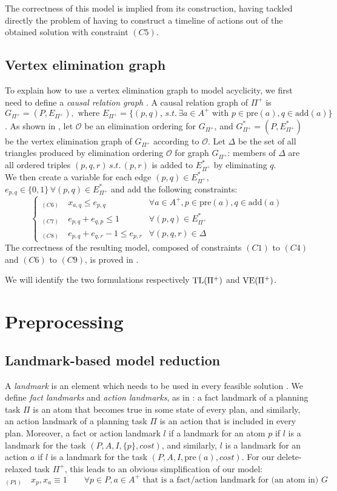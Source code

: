 The correctness of this model is implied from its construction, having tackled directly the problem of having to construct a timeline of actions out of the obtained solution with constraint ${(C5)}$.

\subsection{Vertex elimination graph}
To explain how to use a vertex elimination graph to model acyclicity, we first need to define a \textit{causal relation graph} \cite{Rankooh_22_2}.
A causal relation graph of $\Pi^+$ is $G_{\Pi^+}=(P,E_{\Pi^+}),\mbox{ where }E_{\Pi^+}=\{(p,q),\,s.t.\,\exists a\in A^+\mbox{ with }p\in \mbox{pre}(a),q\in \mbox{add}(a)\}$.
As shown in \cite{Rankooh_22}, let $\mathcal{O}$ be an elimination ordering for $G_{\Pi^+}$, and $G^*_{\Pi^+}=(P,E^*_{\Pi^+})$ be the vertex elimination graph of $G_{\Pi^+}$ according to $\mathcal{O}$. Let $\Delta$ be the set of all triangles produced by elimination ordering $\mathcal{O}$ for graph $G_{\Pi^+}$: members of $\Delta$ are all ordered triples $(p,q,r)\,s.t.\,(p,r)$ is added to $E^*_{\Pi^+}$ by eliminating $q$.\\
We then create a variable for each edge $(p,q)\in E^*_{\Pi^+}$, $e_{p,q}\in\{0,1\}\,\forall (p,q)\in E^*_{\Pi^+}$ and add the following constraints:
$$
\begin{cases}
    _{(C6)}\quad x_{a,q}\leq e_{p,q}&\forall a\in A^+,p\in \mbox{pre}(a),q\in \mbox{add}(a)\\
    _{(C7)}\quad e_{p,q}+e_{q,p}\leq 1&\forall(p,q)\in E^*_{\Pi^+}\\
    _{(C8)}\quad e_{p,q}+e_{q,r}-1\leq e_{p,r}&\forall(p,q,r)\in\Delta
\end{cases}
$$
The correctness of the resulting model, composed of constraints $(C1)$ to $(C4)$ and $(C6)$ to $(C9)$, is proved in \cite{Rankooh_22}.

We will identify the two formulations respectively $\mbox{TL}(\Pi^+)$ and $\mbox{VE}(\Pi^+)$.

\section{Preprocessing}
\subsection{Landmark-based model reduction}
A \textit{landmark} is an element which needs to be used in every feasible solution \cite{Hoffman_04}. We define \textit{fact landmarks} and \textit{action landmarks}, as in \cite{Gefen_12}: a fact landmark of a planning task $\Pi$ is an atom that becomes true in some state of every plan, and similarly, an action landmark of a planning task $\Pi$ is an action that is included in every plan. Moreover, a fact or action landmark $l$ if a landmark for an atom $p$ if $l$ is a landmark for the task $(P,A,I,\{p\},cost)$, and similarly, $l$ is a landmark for an action $a$ if $l$ is a landmark for the task $(P,A,I,\mbox{pre}(a),cost)$.
For our delete-relaxed task $\Pi^+$, this leads to an obvious simplification of our model:
$$_{(P1)}\quad x_p,x_a\equiv1\qquad\forall p\in P,a\in A^+\mbox{ that is a fact/action landmark for (an atom in) }G$$

